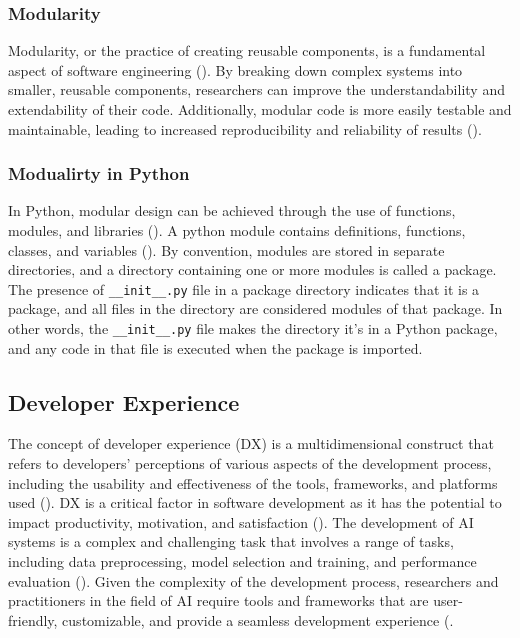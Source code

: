 \subsubsection{Modularity}
Modularity, or the practice of creating reusable components, is a fundamental aspect of software engineering (\cite{pressman2010software}). By breaking down complex systems into smaller, reusable components, researchers can improve the understandability and extendability of their code. Additionally, modular code is more easily testable and maintainable, leading to increased reproducibility and reliability of results (\cite{amershi2019software,pressman2010software}). 
\subsubsection{Modualirty in Python}
In Python, modular design can be achieved through the use of functions, modules, and libraries (\cite{sanner1999python}). 
A python module contains definitions, functions, classes, and variables (\cite{raschka2015python}). By convention, modules are stored in separate directories, and a directory containing one or more modules is called a package. The presence of \verb|__init__.py| file in a package directory indicates that it is a package, and all files in the directory are considered modules of that package. In other words, the \verb|__init__.py| file makes the directory it's in a Python package, and any code in that file is executed when the package is imported.



\subsection{Developer Experience}
The concept of developer experience (DX) is a multidimensional construct that refers to developers' perceptions of various aspects of the development process, including the usability and effectiveness of the tools, frameworks, and platforms used (\cite{fagerholm2012developer}). DX is a critical factor in software development as it has the potential to impact productivity, motivation, and satisfaction (\cite{fagerholm2012developer}).
 The development of AI systems is a complex and challenging task that involves a range of tasks, including data preprocessing, model selection and training, and performance evaluation (\cite{lecun2015deep}). Given the complexity of the development process, researchers and practitioners in the field of AI require tools and frameworks that are user-friendly, customizable, and provide a seamless development experience (\cite{wolf2020designing,li2018can,olson2018system}.


